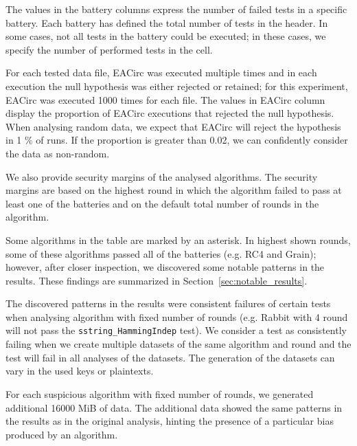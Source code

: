 \documentclass[
	digital,    %
	oneside,    %
	color,
	11pt,
	nocover,
	notable,
	nolof,
	nolot,
]{fithesis3}
\theoremstyle{definition}
\theoremstyle{remark}
\begin{document}
The values in the battery columns express the number of failed tests in a specific battery. Each battery has defined the total number of tests in the header. In some cases, not all tests in the battery could be executed; in these cases, we specify the number of performed tests in the cell. 

For each tested data file, EACirc was executed multiple times and in each execution the null hypothesis was either rejected or retained; for this experiment, EACirc was executed 1000 times for each file. The values in EACirc column display the proportion of EACirc executions that rejected the null hypothesis. When analysing random data, we expect that EACirc will reject the hypothesis in 1 \% of runs. If the proportion is greater than 0.02, we can confidently consider the data as non-random.

We also provide security margins of the analysed algorithms. The security margins are based on the highest round in which the algorithm failed to pass at least one of the batteries and on the default total number of rounds in the algorithm.

Some algorithms in the table are marked by an asterisk. In highest shown rounds, some of these algorithms passed all of the batteries (e.g. RC4 and Grain); however, after closer inspection, we discovered some notable patterns in the results. These findings are summarized in Section~\ref{sec:notable_results}.

The discovered patterns in the results were consistent failures of certain tests when analysing algorithm with fixed number of rounds (e.g. Rabbit with 4 round will not pass the \texttt{sstring\_HammingIndep} test). We consider a test as consistently failing when we create multiple datasets of the same algorithm and round and the test will fail in all analyses of the datasets. The generation of the datasets can vary in the used keys or plaintexts.

For each suspicious algorithm with fixed number of rounds, we generated additional 16000 MiB of data. The additional data showed the same patterns in the results as in the original analysis, hinting the presence of a particular bias produced by an algorithm.
\end{document}
